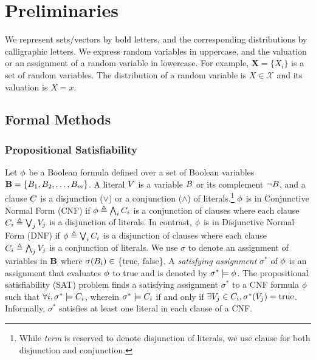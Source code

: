 \chapter{Preliminaries}
\label{chapter:preliminaries}
We represent sets/vectors by bold letters, and the corresponding distributions by calligraphic letters. We express random variables in uppercase, and the valuation or an assignment of a random variable in lowercase. For example, $ \mathbf{X} = \{X_i\} $ is a set of random variables. The distribution of a random variable is $ X \in \mathcal{X} $ and its valuation  is $ X = x $. 




\section{Formal Methods}

\subsection{Propositional Satisfiability}

Let $\phi$ be a Boolean formula defined over a set of Boolean variables $\mathbf{B} = \{B_1,B_2,\dots ,B_m \}$. A literal $ V $ is a variable $ B $ or its complement $\neg B$, and a clause $ C $ is a disjunction ($ \vee $) or a conjunction ($ \wedge $) of literals.\footnote{While \emph{term} is reserved to denote disjunction of literals, we use clause for both disjunction and conjunction.}  $\phi$ is in Conjunctive Normal Form (CNF) if $\phi \triangleq  \bigwedge_i C_i$ is a conjunction of clauses where each clause $C_i \triangleq  \bigvee_j V_j $  is a disjunction of literals. In contrast, $ \phi $ is in Disjunctive Normal Form (DNF) if $\phi \triangleq  \bigvee_i C_i$ is a disjunction of clauses where each clause $C_i \triangleq  \bigwedge_j V_j $ is a conjunction of literals. We use $\sigma$ to denote an assignment of variables in  $\mathbf{B}$ where $ \sigma(B_i) \in $ \{true, false\}. A \emph{satisfying assignment} $ \sigma^* $ of $\phi$ is an assignment  that evaluates $\phi$  to true and is denoted by $ \sigma^* \models \phi $. The propositional satisfiability (SAT) problem finds a satisfying assignment $ \sigma^* $ to a CNF formula $ \phi $  such that $ \forall i, \sigma^* \models C_i $, wherein $ \sigma^*\models C_i $ if and only if $ \exists V_j \in C_i, \sigma^*(V_j) = \text{true} $. Informally, $ \sigma^* $ satisfies at least one literal in each clause of a CNF. 




